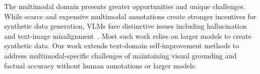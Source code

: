 The multimodal domain presents greater opportunities and unique challenges. While scarce and expensive multimodal annotations create stronger incentives for synthetic data generation, VLMs face distinctive issues including hallucination~\cite{sun2023aligninglargemultimodalmodels, povid, zhou2024analyzingmitigatingobjecthallucination,leng2023mitigatingobjecthallucinationslarge} and text-image misalignment~\cite{zhou2024aligningmodalitiesvisionlarge}. Most such work relies on larger models to create synthetic data. Our work extends text-domain self-improvement methods to address multimodal-specific challenges of maintaining visual grounding and factual accuracy without human annotations or larger models.